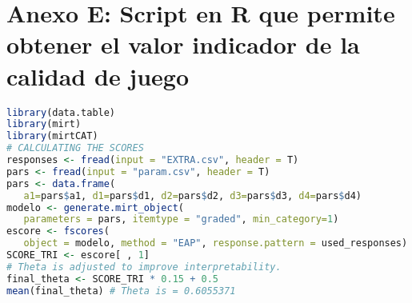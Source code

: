 \chapter*{Anexo E: Script en R que permite obtener el valor indicador de la calidad de juego}\label{AnexoE}



\begin{lstlisting}[language=R, caption=Script en R para evaluar el videojuego]
library(data.table)
library(mirt)
library(mirtCAT)
# CALCULATING THE SCORES
responses <- fread(input = "EXTRA.csv", header = T)
pars <- fread(input = "param.csv", header = T)
pars <- data.frame(
   a1=pars$a1, d1=pars$d1, d2=pars$d2, d3=pars$d3, d4=pars$d4)
modelo <- generate.mirt_object(
   parameters = pars, itemtype = "graded", min_category=1)
escore <- fscores(
   object = modelo, method = "EAP", response.pattern = used_responses)
SCORE_TRI <- escore[ , 1]
# Theta is adjusted to improve interpretability.
final_theta <- SCORE_TRI * 0.15 + 0.5
mean(final_theta) # Theta is = 0.6055371
\end{lstlisting}

\restoregeometry
